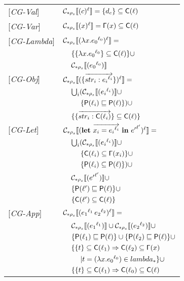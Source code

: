 \begin{tabular}{l l l l}
{[\textit{CG-Val}]} & \multicolumn{3}{l}{$ \mathcal{C}_{*\rho_s}\llbracket (c)^\ell \rrbracket = \{d_c\} \subseteq \mathsf{C}(\ell)$} \\ 
{[\textit{CG-Var}]} & \multicolumn{3}{l}{$ \mathcal{C}_{*\rho_s}\llbracket (x)^\ell \rrbracket = \mathsf{\Gamma}(x) \subseteq \mathsf{C}(\ell)$} \\ 
{[\textit{CG-Lambda}]} & \multicolumn{3}{l}{$ \mathcal{C}_{*\rho_s}\llbracket (\lambda x.{e_0}^{\ell_0})^\ell \rrbracket = $}\\
&& \multicolumn{2}{l}{$\{\{\lambda x.{e_0}^{\ell_0}\} \subseteq \mathsf{C}(\ell)\}\cup $}\\
&& \multicolumn{2}{l}{$ \mathcal{C}_{*\rho_s}\llbracket ({e_0}^{\ell_0}) \rrbracket $} \\
{[\textit{CG-Obj}]} & \multicolumn{3}{l}{$ \mathcal{C}_{*\rho_s}\llbracket (\{\overrightarrow{str_i : {e_i}^{\ell_i}}\})^\ell \rrbracket = $}\\
&& \multicolumn{2}{l}{$\bigcup_i (\mathcal{C}_{*\rho_s}\llbracket ({e_i}^{\ell_i}) \rrbracket \cup$}\\
&&& $\{\mathsf{P}(\ell_i) \sqsubseteq \mathsf{P}(\ell)\})\cup$\\ 
&& \multicolumn{2}{l}{$\{ \{\overrightarrow{str_i : \mathsf{C}(\ell_i)}\} \subseteq \mathsf{C}(\ell) \} $} \\
{[\textit{CG-Let}]} & \multicolumn{3}{l}{$\mathcal{C}_{*\rho_s}\llbracket (\mathbf{let}\ \overrightarrow{x_i = {e_i}^{\ell_i}}\ \mathbf{in}\ {e'}^{\ell'})^\ell \rrbracket = $}\\
&& \multicolumn{2}{l}{$ \bigcup_i (\mathcal{C}_{*\rho_s}\llbracket ({e_i}^{\ell_i}) \rrbracket \cup$ }\\
&&& $ \{\mathsf{C}(\ell_i) \subseteq \mathsf{\Gamma}(x_i)\} \cup$ \\
&&& $ \{ \mathsf{P}(\ell_i) \subseteq \mathsf{P}(\ell) \}) \cup $ \\
&& \multicolumn{2}{l}{$ \mathcal{C}_{*\rho_s}\llbracket ({e'}^{\ell'}) \rrbracket \cup$} \\
&& \multicolumn{2}{l}{$ \{\mathsf{P}(\ell') \sqsubseteq \mathsf{P}(\ell)\} \cup$}\\
&& \multicolumn{2}{l}{$ \{\mathsf{C}(\ell') \subseteq \mathsf{C}(\ell)\} $}\\
{[\textit{CG-App}]}&\multicolumn{3}{l}{$ \mathcal{C}_{*\rho_s}\llbracket ({e_1}^{\ell_1}\, {e_2}^{\ell_2})^\ell \rrbracket = $}\\
&& \multicolumn{2}{l}{$\mathcal{C}_{*\rho_s}\llbracket ({e_1}^{\ell_1}) \rrbracket \cup \mathcal{C}_{*\rho_s}\llbracket ({e_2}^{\ell_2}) \rrbracket \cup$} \\
&& \multicolumn{2}{l}{$\{ \mathsf{P}(\ell_1) \sqsubseteq \mathsf{P}(\ell) \} \cup \{ \mathsf{P}(\ell_2) \sqsubseteq \mathsf{P}(\ell) \}\cup$} \\
&& \multicolumn{2}{l}{$\{\{ t \} \subseteq \mathsf{C}(\ell_1) \Rightarrow \mathsf{C}(\ell_2) \subseteq \mathsf{\Gamma}(x)$}\\
&&&$| t = (\lambda x.{e_0}^{\ell_0}) \in lambda_* \}\cup$\\
&& \multicolumn{2}{l}{$\{\{ t \} \subseteq \mathsf{C}(\ell_1) \Rightarrow \mathsf{C}(\ell_0) \subseteq \mathsf{C}(\ell)$}\\

\end{tabular}
